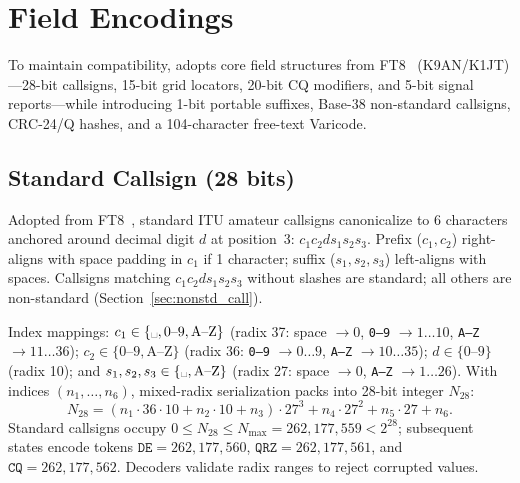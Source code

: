 \section{Field Encodings}
\label{sec:fields}
{\setlength{\abovedisplayskip}{2.0pt plus 1.5pt minus 1.0pt}
\setlength{\belowdisplayskip}{2.0pt plus 1.5pt minus 1.0pt}

To maintain compatibility, \LQ{} adopts core field structures from FT8~\cite{ft8,wsjtx} (K9AN/K1JT)---28-bit callsigns, 15-bit grid locators, 20-bit CQ modifiers, and 5-bit signal reports---while introducing 1-bit portable suffixes, Base-38 non-standard callsigns, CRC-24/Q hashes, and a 104-character free-text Varicode.

\subsection{Standard Callsign (28 bits)}
\label{sec:std_call}

Adopted from FT8~\cite{ft8,wsjtx}, standard ITU amateur callsigns canonicalize to 6 characters anchored around decimal digit $d$ at position~3: $c_1 c_2 d s_1 s_2 s_3$. Prefix ($c_1, c_2$) right-aligns with space padding in $c_1$ if 1 character; suffix ($s_1, s_2, s_3$) left-aligns with spaces. Callsigns matching $c_1 c_2 d s_1 s_2 s_3$ without slashes are standard; all others are non-standard (Section~\ref{sec:nonstd_call}).

Index mappings: $c_1 \in \{\text{\textvisiblespace}, \text{0--9}, \text{A--Z}\}$ (radix 37: space $\to 0$, \texttt{0--9} $\to 1\dots 10$, \texttt{A--Z} $\to 11\dots 36$); $c_2 \in \{\text{0--9}, \text{A--Z}\}$ (radix 36: \texttt{0--9} $\to 0\dots 9$, \texttt{A--Z} $\to 10\dots 35$); $d \in \{\text{0--9}\}$ (radix 10); and $s_1, s_2, s_3 \in \{\text{\textvisiblespace}, \text{A--Z}\}$ (radix 27: space $\to 0$, \texttt{A--Z} $\to 1\dots 26$). With indices $(n_1, \dots, n_6)$, mixed-radix serialization packs into 28-bit integer $N_{28}$:
\begin{equation}
  N_{28} = (n_1 \cdot 36 \cdot 10 + n_2 \cdot 10 + n_3) \cdot 27^3 + n_4 \cdot 27^2 + n_5 \cdot 27 + n_6.
\label{eq:call28}
\end{equation}
Standard callsigns occupy $0 \le N_{28} \le N_{\max} = 262{,}177{,}559 < 2^{28}$; subsequent states encode tokens $\texttt{DE} = 262{,}177{,}560$, $\texttt{QRZ} = 262{,}177{,}561$, and $\texttt{CQ} = 262{,}177{,}562$. Decoders validate radix ranges to reject corrupted values.

}
